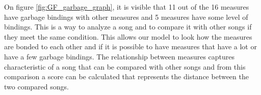 On figure \ref{fig:GF_garbage_graph}, it is visible that 11 out of the 16 measures have garbage bindings with other measures and 5 measures have some level of bindings. This is a way to analyze a song and to compare it with other songs if they meet the same condition. This allows our model to look how the measures are bonded to each other and if it is possible to have measures that have a lot or have a few garbage bindings. The relationship between measures captures characteristic of a song that can be compared with other songs and from this comparison a score can be calculated that represents the distance between the two compared songs.